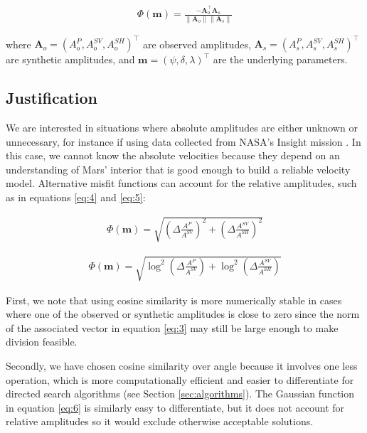 \documentclass[preprint]{seismica}
\begin{document}
    \begin{align} \label{eq:3}
      \Phi(\bm{m}) = \frac{-\bm{A}_o^\top\bm{A}_s}{\|\bm{A}_o\|\|\bm{A}_s\|}
    \end{align}

    where $\bm{A}_o = (A_o^P, A_o^{SV}, A_o^{SH})^\top$ are observed amplitudes, $\bm{A}_s =
    (A_s^P, A_s^{SV}, A_s^{SH})^\top$ are synthetic amplitudes, and
    $\bm{m} = (\psi, \delta, \lambda)^\top$ are the underlying parameters.

  \subsection{Justification}
    We are interested in situations where absolute amplitudes are either unknown or unnecessary, for
    instance if using data collected from NASA's Insight mission \citep{sita_potential_2022}.
    In this case, we cannot know the absolute velocities because they depend on an understanding of
    Mars' interior that is good enough to build a reliable velocity model. Alternative misfit
    functions can account for the relative amplitudes, such as in equations \ref{eq:4} and
    \ref{eq:5}:

    \begin{align} \label{eq:4}
      \Phi(\bm{m}) = \sqrt{\left( \Delta \frac{A^{P}}{A^{SV}}\right)^2 + \left( \Delta \frac{A^{SV}}{A^{SH}}\right)^2}
    \end{align}

    \begin{align} \label{eq:5}
      \Phi(\bm{m}) = \sqrt{\log^2 \left( \Delta \frac{A^P}{A^{SV}} \right) + \log^2 \left( \Delta \frac{A^{SV}}{A^{SH}} \right)}
    \end{align}

    First, we note that using cosine similarity is more numerically stable in cases where one of the
    observed or synthetic amplitudes is close to zero since the norm of the associated vector in
    equation \ref{eq:3} may still be large enough to make division feasible.

    Secondly, we have chosen cosine similarity over angle because it involves one less operation,
    which is more computationally efficient and easier to differentiate for directed search
    algorithms (see Section \ref{sec:algorithms}). The Gaussian function in equation \ref{eq:6} is
    similarly easy to differentiate, but it does not account for relative amplitudes so it would
    exclude otherwise acceptable solutions.
\end{document}
